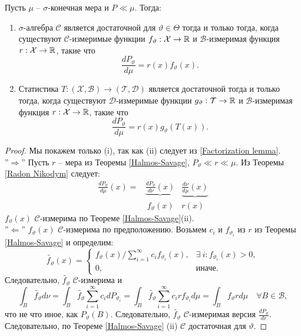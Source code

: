 \begin{thm} \label{Neyman criterion} Пусть $\mu$ -- $\sigma$-конечная мера и $P \ll \mu$. Тогда:
	\begin{enumerate}
		\item $\sigma$-алгебра $\mathcal{C}$ является достаточной для $\vartheta \in \Theta$ тогда и только тогда, когда существуют $\mathcal{C}$-измеримые функции $f_\vartheta:\mathcal{X} \rightarrow \mathbb{R}$ и $\mathcal{B}$-измеримая функция $r:\mathcal{X} \rightarrow \mathbb{R}$, такие что
		\[ \frac{dP_\vartheta}{d\mu}=r(x)f_\vartheta(x). \]
		\item Статистика $T:(\mathcal{X},\mathcal{B}) \rightarrow (\mathcal{T},\mathcal{D})$ является достаточной тогда и только тогда, когда существуют $\mathcal{D}$-измеримые функции $g_\vartheta:\mathcal{T} \rightarrow \mathbb{R}$ и $\mathcal{B}$-измеримая функция $r:\mathcal{X} \rightarrow \mathbb{R}$, такие что
		\[\frac{dP_\vartheta}{d\mu}=r(x)g_\vartheta(T(x)). \]
	\end{enumerate}
\end{thm}
\begin{proof}
	Мы покажем только (i), так как (ii) следует из \ref{Factorization lemma}. \\
	''$\Longrightarrow$'' Пусть $r$ -- мера из Теоремы \ref{Halmos-Savage}, $P_\vartheta \ll r \ll \mu$. Из Теоремы \ref{Radon Nikodym} следует:
	\[
	\begin{aligned}
	\frac{dP_\vartheta}{d \mu}(x) = & \underbrace{\frac{d P_\vartheta}{d \nu}(x)} & \underbrace{\frac{d \nu}{d \mu}(x)} \\
    &\ f_\vartheta(x) & r(x) \
	\end{aligned} \] 
	$f_\vartheta(x)$ $\mathcal{C}$-измерима по Теореме \ref{Halmos-Savage}(ii). \\
	''$\Longleftarrow$''
	$f_\vartheta(x)$ $\mathcal{C}$-измерима по предположению. Возьмем $c_i$ и $f_{\vartheta_i}$ из $r$ из Теоремы \ref{Halmos-Savage} и определим:
	\[ \widetilde{f_\vartheta}(x) =
	\left \{
	\begin{array}{cl}
	f_\vartheta(x) / \sum_{i=1}^{\infty} c_i f_{\vartheta_i}(x) , & \exists\ i: f_{\vartheta_i}(x) > 0, \\
	0, & \text{иначе}.
	\end{array}
	\right.
	\]
	Следовательно, $\widetilde{f_\vartheta}$ $\mathcal{C}$-измерима и
	\[ \int_B  \widetilde{f_\vartheta}d\nu = \int_B \widetilde{f_\vartheta} \sum_{i=1}^{\infty} c_i dP_{\vartheta_i} = \int_B \widetilde{f_\vartheta} \sum_{i=1}^{\infty} c_i r f_{\vartheta_i}d\mu = \int_B f_\vartheta r d\mu \quad \forall B \in \mathcal{B},  \]
	что не что иное, как $P_\vartheta(B)$. Следовательно, $\widetilde{f_\vartheta}$ $\mathcal{C}$-измеримая версия $\frac{dP_\vartheta}{dr}$. Следовательно, по Теореме \ref{Halmos-Savage} (ii) $\mathcal{C}$ достаточная для $\vartheta$.
\end{proof}

